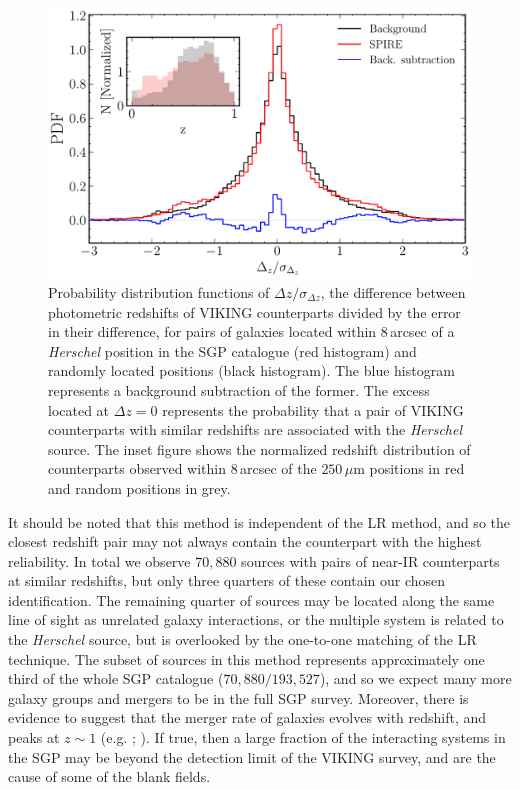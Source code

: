 \begin{figure}
    \centering
    \includegraphics[width=0.75\columnwidth]{Figures/delta_z_multiplicity.pdf}
    \caption[PDFs of $\Delta z/\sigma_{\Delta z}$ for \textit{Herschel} sources and random positions]{Probability distribution functions of $\Delta z/\sigma_{\Delta z}$, the difference between photometric redshifts of VIKING counterparts divided by the error in their difference, for pairs of galaxies located within $8\,$arcsec of a \textit{Herschel} position in the SGP catalogue (red histogram) and randomly located positions (black histogram). The blue histogram represents a background subtraction of the former. The excess located at $\Delta z = 0$ represents the probability that a pair of VIKING counterparts with similar redshifts are associated with the \textit{Herschel} source. The inset figure shows the normalized redshift distribution of counterparts observed within $8\,$arcsec of the $250\,\mu$m positions in red and random positions in grey.}
    \label{fig:delta_z_multiplicity}
\end{figure}

It should be noted that this method is independent of the LR method, and so the closest redshift pair may not always contain the counterpart with the highest reliability. In total we observe $70,880$ sources with pairs of near-IR counterparts at similar redshifts, but only three quarters of these contain our chosen identification. The remaining quarter of sources may be located along the same line of sight as unrelated galaxy interactions, or the multiple system is related to the \textit{Herschel} source, but is overlooked by the one-to-one matching of the LR technique. The subset of sources in this method represents approximately one third of the whole SGP catalogue ($70,880/193,527$), and so we expect many more galaxy groups and mergers to be in the full SGP survey. Moreover, there is evidence to suggest that the merger rate of galaxies evolves with redshift, and peaks at $z \sim 1$ (e.g. \citealt{Bell_2006}; \citealt{Ryan_2008}). If true, then a large fraction of the interacting systems in the SGP may be beyond the detection limit of the VIKING survey, and are the cause of some of the blank fields.

